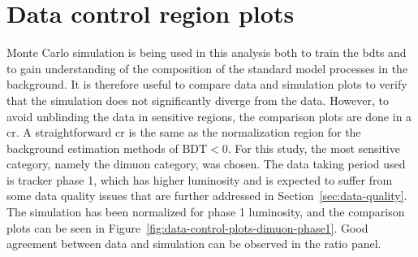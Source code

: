 \clearpage
\section{Data control region plots}
\label{sec:data-control-region-plots}

Monte Carlo simulation is being used in this analysis both to train the \glspl{bdt} and to gain understanding of the composition of the standard model processes in the background. It is therefore useful to compare data and simulation plots to verify that the simulation does not significantly diverge from the data. However, to avoid unblinding the data in sensitive regions, the comparison plots are done in a \gls{cr}. A straightforward \gls{cr} is the same as the normalization region for the background estimation methods of $\text{BDT} < 0$. For this study, the most sensitive category, namely the dimuon category, was chosen. The data taking period used is tracker phase 1, which has higher luminosity and is expected to suffer from some data quality issues that are further addressed in Section~\ref{sec:data-quality}. The simulation has been normalized for phase 1 luminosity, and the comparison plots can be seen in Figure~\ref{fig:data-control-plots-dimuon-phase1}. Good agreement between data and simulation can be observed in the ratio panel.


